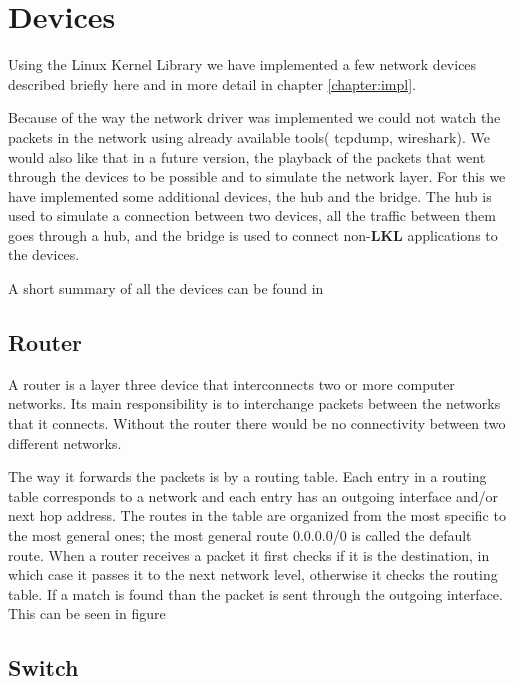 
\section{Devices}
\label{sec:devices}

Using the Linux Kernel Library we have implemented a few network devices described briefly
here and in more detail in chapter \ref{chapter:impl}.

Because of the way the network driver was implemented we could not watch the packets in the
network using already available tools( tcpdump, wireshark). We would also like that in a future version,
the playback of the packets that went through the devices to be possible and to simulate the network layer.
For this we have implemented some additional devices, the hub and the bridge. The hub is used to simulate a connection between 
two devices, all the traffic between them goes through a hub, and the bridge is used to connect non-\textbf{LKL} 
applications to the \text{\project} devices.

A short summary of all the devices can be found in 

\subsection{Router}
\label{sub-sec:router}

A router is a layer three device that interconnects two or more computer networks. Its main responsibility
is to interchange packets between the networks that it connects. Without the router there would be no connectivity 
between two different networks.

The way it forwards the packets is by a routing table. Each entry in a routing table corresponds to a network
and each entry has an outgoing interface and/or next hop address. The routes in the table are organized from the most specific
to the most general ones; the most general route 0.0.0.0/0 is called the default route. When a router receives a packet it 
first checks if it is the destination, in which case it passes it to the next network level, otherwise it checks the routing
table. If a match is found than the packet is sent through the outgoing interface. This can be seen in figure 


\subsection{Switch}
\label{sub-sec:switch}

